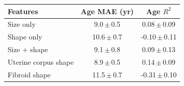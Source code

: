 \begin{tabular}{lcc}
\toprule
Features & Age MAE (yr) & Age $R^2$ \\
\midrule
Size only & 9.0\,$\pm$\,0.5 & 0.08\,$\pm$\,0.09 \\
Shape only & 10.6\,$\pm$\,0.7 & -0.10\,$\pm$\,0.11 \\
Size $+$ shape & 9.1\,$\pm$\,0.8 & 0.09\,$\pm$\,0.13 \\
\midrule
Uterine corpus shape & 8.9\,$\pm$\,0.5 & 0.14\,$\pm$\,0.09 \\
Fibroid shape & 11.5\,$\pm$\,0.7 & -0.31\,$\pm$\,0.10 \\
\bottomrule
\end{tabular}
